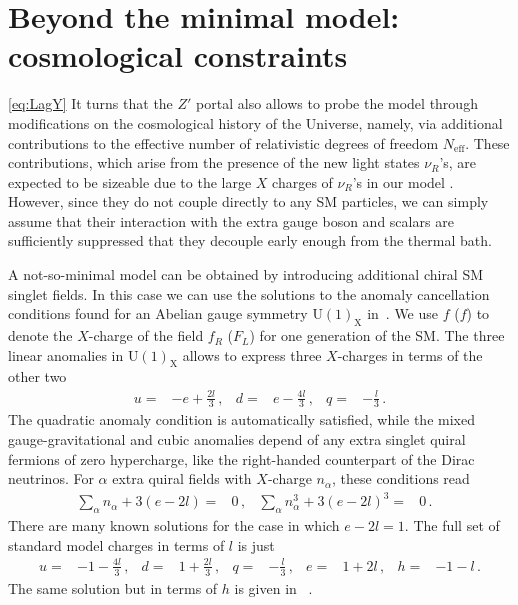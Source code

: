 \documentclass[12pt]{article}
\begin{document}
\section{Beyond the minimal model: cosmological constraints}
\label{sec:CosmoConstraints}
\ref{eq:LagY}
It turns that the $Z'$ portal also allows to probe the model through modifications on the cosmological history of the Universe, namely, via additional contributions to the effective number of relativistic degrees of freedom $N_{\text{eff}}$. These contributions, which arise from the presence of the new light states $\nu_R$'s, are expected to be sizeable due to the large $X$ charges of $\nu_R$'s in our model . However, since they do not couple directly to any SM particles, we can simply assume that their interaction with the extra gauge boson and scalars are sufficiently suppressed that they  decouple early enough from the thermal bath. 

A not-so-minimal model can be obtained by introducing additional chiral SM singlet fields. 
In this case we can use the solutions to the anomaly cancellation conditions found for an Abelian gauge symmetry $\operatorname{U(1)_X}$ in~\cite{Jenkins:1987ue,Appelquist:2002mw,Campos:2017dgc,Okada:2018tgy,Jana:2019mez}.
We use $f$ ($f$) to denote the $X$-charge of the field $f_R$ ($F_L$) for one generation of the SM. The three linear anomalies in $\operatorname{U(1)_X}$ allows to express three $X$-charges in terms of the other two
\begin{align}
  u=&-e+\frac{2l}{3}\,,& d=& e-\frac{4l}{3}\,,& q=& -\frac{l}{3}\,.
\end{align}
The quadratic anomaly condition is automatically satisfied, while the mixed gauge-gravitational and cubic anomalies depend of any extra singlet quiral fermions of zero hypercharge, like the right-handed counterpart of the Dirac neutrinos. For $\alpha$ extra quiral fields with $X$-charge $n_{\alpha}$, these conditions read
\begin{align}
  \sum_{\alpha} n_{\alpha}+3 (e-2l)=&0\,, &   \sum_{\alpha} n_{\alpha}^3+3 (e-2l)^3=&0\,. &
\end{align}
There are many known solutions for the case in which $e-2l=1$. The full set of standard model charges in terms of $l$ is just
\begin{align}
  u=&-1-\frac{4l}{3}\,,&d=&1+\frac{2l}{3}\,,&q=&-\frac{l}{3}\,,&e=&1+2l\,,&h=&-1-l\,.
  \label{Eq:SMCharges}
\end{align}
The same solution but in terms of $h$ is given in ~\cite{Okada:2018tgy}.
\end{document}
